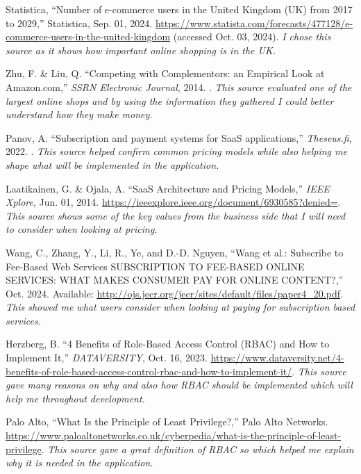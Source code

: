 \documentclass[]{project_report}
\begin{document}
\begin{thebibliography}{99}


Statistica, “Number of e-commerce users in the United Kingdom (UK) from 2017 to 2029,” Statistica, Sep. 01, 2024. \url{https://www.statista.com/forecasts/477128/e-commerce-users-in-the-united-kingdom} (accessed Oct. 03, 2024).
\textit{I chose this source as it shows how important online shopping is in the UK.}

Zhu, F. \& Liu, Q. “Competing with Complementors: an Empirical Look at Amazon.com,” \emph{SSRN Electronic Journal}, 2014. .
\textit{This source evaluated one of the largest online shops and by using the information they gathered I could better understand how they make money.}

Panov, A. “Subscription and payment systems for SaaS applications,” \emph{Theseus.fi}, 2022. .
\textit{This source helped confirm common pricing models while also helping me shape what will be implemented in the application.}

Laatikainen, G. \& Ojala, A. “SaaS Architecture and Pricing Models,” \emph{IEEE Xplore}, Jun. 01, 2014. \url{https://ieeexplore.ieee.org/document/6930585?denied=}.
\textit{This source shows some of the key values from the business side that I will need to consider when looking at pricing.}

Wang, C., Zhang, Y., Li, R., Ye, and D.-D. Nguyen, “Wang et al.: Subscribe to Fee-Based Web Services SUBSCRIPTION TO FEE-BASED ONLINE SERVICES: WHAT MAKES CONSUMER PAY FOR ONLINE CONTENT?,” Oct. 2024. Available: \url{http://ojs.jecr.org/jecr/sites/default/files/paper4_20.pdf}.
\textit{This showed me what users consider when looking at paying for subscription based services.}

Herzberg, B. “4 Benefits of Role-Based Access Control (RBAC) and How to Implement It,” \emph{DATAVERSITY}, Oct. 16, 2023. \url{https://www.dataversity.net/4-benefits-of-role-based-access-control-rbac-and-how-to-implement-it/}.
\textit{This source gave many reasons on why and also how RBAC should be implemented which will help me throughout development.}

Palo Alto, “What Is the Principle of Least Privilege?,” Palo Alto Networks. \url{https://www.paloaltonetworks.co.uk/cyberpedia/what-is-the-principle-of-least-privilege}.
\textit{This source gave a great definition of RBAC so which helped me explain why it is needed in the application.}


\end{thebibliography}
\end{document}
